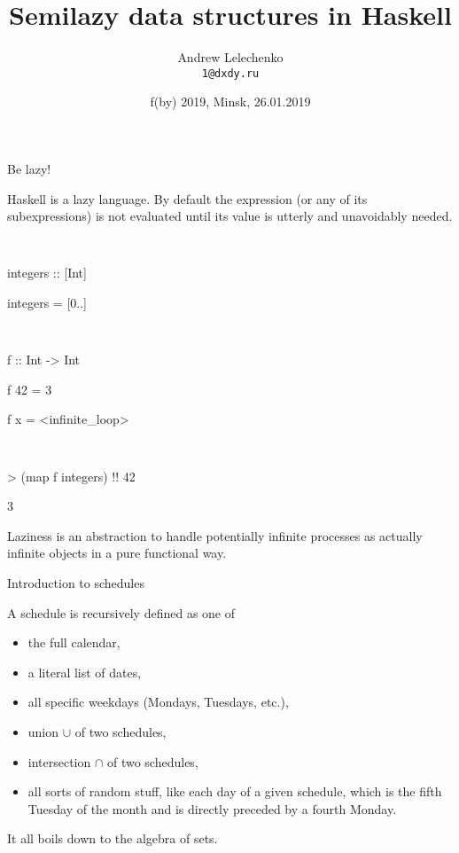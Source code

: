 \documentclass[handout]{beamer}
\title{Semilazy data structures in Haskell}
\author[Andrew Lelechenko]{Andrew Lelechenko \\ \texttt{1@dxdy.ru}}
\institute[Barclays]{Barclays, London}
\date{f(by) 2019, Minsk, 26.01.2019}
\begin{document}
\begin{frame}
	\titlepage
\end{frame}

\begin{frame}{Be lazy!}

Haskell is a lazy language.
By default the expression (or any of its subexpressions)
is not evaluated until its value
is utterly and unavoidably needed.

\bigskip

{\tt
\par integers :: [Int]
\par integers = [0..]
}

\medskip

{\tt
\par f :: Int -> Int
\par f 42 = 3
\par f x  = <infinite\_loop>
}

\medskip

{\tt
\par > (map f integers) !! 42
\par 3
}

\bigskip

\pause

Laziness is an abstraction to handle potentially infinite processes
as actually infinite objects in a pure functional way.

\end{frame}

\begin{frame}{Introduction to schedules}

A schedule is recursively defined as one of
\begin{itemize}
\item the full calendar,
\pause
\item a literal list of dates,
\pause
\item all specific weekdays (Mondays, Tuesdays, etc.),
\pause
\item union $\cup$ of two schedules,
\pause
\item intersection $\cap$ of two schedules,
\pause
\item all sorts of random stuff,
like each day of a given schedule,
which is the fifth Tuesday of the month
and is directly preceded by a fourth Monday.
\end{itemize}

\bigskip

\pause
It all boils down to the algebra of sets.

\end{frame}
\end{document}
